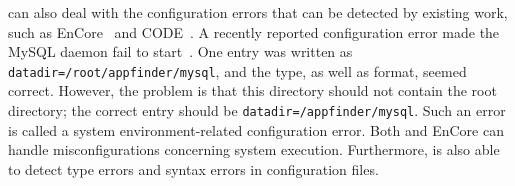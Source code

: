 \app can also deal with the configuration errors that can be detected by
existing work, such as EnCore~\cite{zhang14encore} and
CODE~\cite{yuan11context}.
A recently reported configuration error made the MySQL
daemon fail to start~\cite{syserror}.
One entry was written as 
{\tt datadir=/root/appfinder/mysql}, and the type, as well as 
format, seemed correct.
However, the problem is that this directory should not 
contain the root directory; the correct entry
should be {\tt datadir=/appfinder/mysql}.
Such an error is called a system environment-related configuration error.
Both \app and EnCore can handle misconfigurations concerning system execution.
Furthermore, \app is also able to detect type errors and syntax errors
in configuration files.
